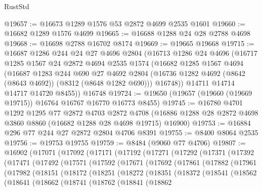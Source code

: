 \begin{lexlean}{RustStd}
\begin{coremodule}
@19657 := @16673 @1289 @1576 @53 @2872 @4699 @2535 @1601
@19660 := @16682 @1289 @1576 @4699
@19665 := @16688 @1288 @24 @28 @2788 @4698
@19668 := @16698 @2788 @16702 @8174
@19669 := @19665 @19668
@19715 := @16687
    @1286
    @244
    @24
    @27
    @4696
    @2804
    (@16713
      @1286
      @24
      @4696
      (@16717
        @1285
        @1567
        @24
        @2872
        @4694
        @2535
        @1574
        (@16682
          @1285
          @1567
          @4694
          (@16687
            @1283
            @244
            @690
            @27
            @4692
            @2804
            (@16736 @1282 @4692 (@8642 (@8643 @4692)) (@8312 (@8648 @1282 @690)))
            @16748))
        @14711
        @14714
        @14717
        @14720
        @8455))
    @16748
@19724 := @19650 (@19657 (@19660 (@19669 @19715)) @16764 @16767 @16770 @16773 @8455)
@19745 := @16780
    @4701
    @1292
    @1295
    @77
    @2872
    @4703
    @2872
    @4708
    (@16886 @1288 @28 @2872 @4698 @3860 @8860 (@16682 @1288 @28 @4698 @19715) @16900)
@19753 := @16884 @296 @77 @244 @27 @2872 @2804 @4706 @8391
@19755 := @8400 @8064 @2535
@19756 := @19753 @19755
@19759 := @8484 (@9060 @77 @4706)
@19807 := @16902
    (@17071
      (@17092
        (@17171
          (@17192
            (@17271
              (@17292
                (@17371
                  (@17392
                    (@17471
                      (@17492
                        (@17571
                          (@17592
                            (@17671
                              (@17692
                                (@17861
                                  (@17882
                                    (@17961
                                      (@17982
                                        (@18151
                                          (@18172
                                            (@18251
                                              (@18272
                                                (@18351
                                                  (@18372
                                                    (@18541
                                                      (@18562
                                                        (@18641
                                                          (@18662
                                                            (@18741
                                                              (@18762
                                                                (@18841
                                                                  (@18862

\end{coremodule}
\end{lexlean}
